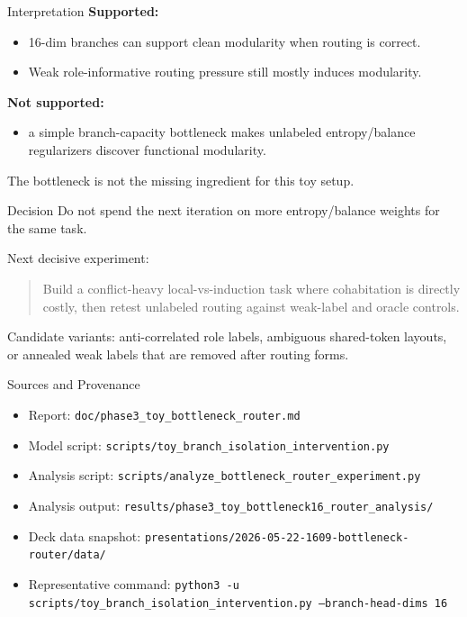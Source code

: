 \documentclass[aspectratio=169]{beamer}
\begin{document}
\begin{frame}{Interpretation}
  \textbf{Supported:}
  \begin{itemize}
    \item 16-dim branches can support clean modularity when routing is correct.
    \item Weak role-informative routing pressure still mostly induces modularity.
  \end{itemize}

  \vspace{0.6em}
  \textbf{Not supported:}
  \begin{itemize}
    \item a simple branch-capacity bottleneck makes unlabeled entropy/balance
      regularizers discover functional modularity.
  \end{itemize}

  \vspace{0.6em}
  The bottleneck is not the missing ingredient for this toy setup.
\end{frame}

\begin{frame}{Decision}
  Do not spend the next iteration on more entropy/balance weights for the same
  task.

  \vspace{0.8em}
  Next decisive experiment:
  \begin{quote}
    Build a conflict-heavy local-vs-induction task where cohabitation is directly
    costly, then retest unlabeled routing against weak-label and oracle controls.
  \end{quote}

  \vspace{0.8em}
  Candidate variants: anti-correlated role labels, ambiguous shared-token
  layouts, or annealed weak labels that are removed after routing forms.
\end{frame}

\begin{frame}{Sources and Provenance}
  \scriptsize
  \begin{itemize}
    \item Report: \texttt{doc/phase3\_toy\_bottleneck\_router.md}
    \item Model script: \texttt{scripts/toy\_branch\_isolation\_intervention.py}
    \item Analysis script: \texttt{scripts/analyze\_bottleneck\_router\_experiment.py}
    \item Analysis output: \texttt{results/phase3\_toy\_bottleneck16\_router\_analysis/}
    \item Deck data snapshot: \texttt{presentations/2026-05-22-1609-bottleneck-router/data/}
    \item Representative command: \texttt{python3 -u scripts/toy\_branch\_isolation\_intervention.py --branch-head-dims 16}
  \end{itemize}
\end{frame}
\end{document}

